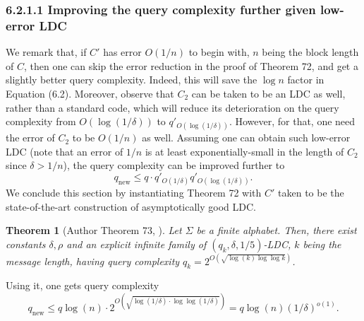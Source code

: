 \documentclass[10pt,a4paper]{article}
\newtheorem{nttheorem}{Theorem}
\begin{document}
\subsubsection*{6.2.1.1 Improving the query complexity further given low-error LDC}
We remark that, if $C'$ has error $O(1/n)$ to begin with, $n$ being the block length of $C$, then one can skip the error reduction in the proof of Theorem 72, and get a slightly better query complexity. Indeed, this will save the $\log n$ factor in Equation (6.2). Moreover, observe that $C_2$ can be taken to be an LDC as well, rather than a standard code, which will reduce its deterioration on the query complexity from $O(\log(1/\delta))$ to $q'_{O(\log(1/\delta))}$. However, for that, one need the error of $C_2$ to be $O(1/n)$ as well. Assuming one can obtain such low-error LDC (note that an error of $1/n$ is at least exponentially-small in the length of $C_2$ since $\delta>1/n$), the query complexity can be improved further to
\[q_{\mathrm{new}}\leq q\cdot q'_{O(1/\delta)}q'_{O(\log(1/\delta))}.\]
We conclude this section by instantiating Theorem 72 with $C'$ taken to be the state-of-the-art construction of asymptotically good LDC.
\setcounter{nttheorem}{72}
\begin{nttheorem}[Author Theorem 73, {\cite{ref26}}]
Let $\Sigma$ be a finite alphabet. Then, there exist constants $\delta,\rho$ and an explicit infinite family of $(q_k,\delta,1/5)$-LDC, $k$ being the message length, having query complexity $q_k=2^{O(\sqrt{\log(k)\log\log k})}$.
\end{nttheorem}
Using it, one gets query complexity
\[q_{\mathrm{new}}\leq q\log(n)\cdot2^{O(\sqrt{\log(1/\delta)\cdot\log\log(1/\delta)})}=q\log(n)(1/\delta)^{o(1)}.\]
\end{document}
